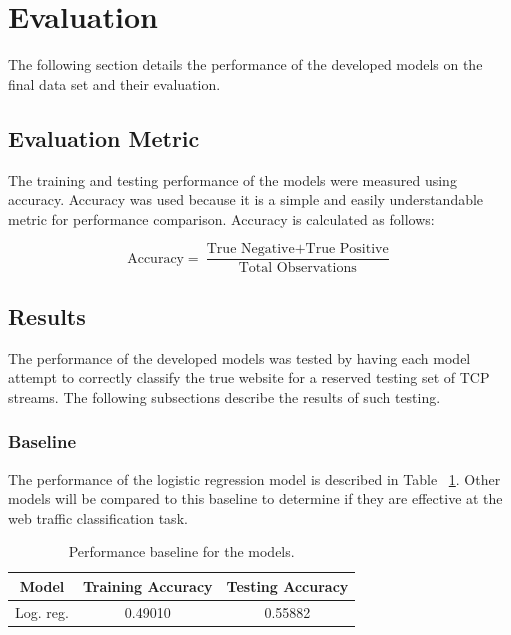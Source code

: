 \documentclass[10pt,sigconf,letterpaper,nonacm]{acmart}
\begin{document}
\section{Evaluation}

The following section details the performance of the developed models on the final data set and their evaluation.

\subsection{Evaluation Metric}

The training and testing performance of the models were measured using accuracy.
Accuracy was used because it is a simple and easily understandable metric for performance comparison.
Accuracy is calculated as follows:

\begin{equation}
  \text{Accuracy} = \frac{\text{True Negative} + \text{True Positive}}{\text{Total Observations}}
\end{equation}

\subsection{Results}

The performance of the developed models was tested by having each model attempt to correctly classify the true website for a reserved testing set of TCP streams.
The following subsections describe the results of such testing.

\subsubsection{Baseline}

The performance of the logistic regression model is described in Table ~\ref{tab:log}.
Other models will be compared to this baseline to determine if they are effective at the web traffic classification task.

\begin{table}[h]
  \caption{Performance baseline for the models.}
  \label{tab:log}
  \begin{tabular}{ccc}
    \toprule
    Model & Training Accuracy & Testing Accuracy \\
    \midrule
    Log. reg. & 0.49010 & 0.55882 \\
    \bottomrule
  \end{tabular}
\end{table}
\end{document}

